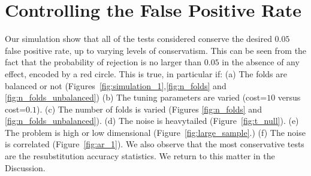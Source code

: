\documentclass[12pt,a4paper]{article}
\theoremstyle{definition}
\begin{document}
\section{Controlling the False Positive Rate}
\label{sec:type_i}

Our simulation show that all of the tests considered conserve the desired $0.05$ false positive rate, up to varying levels of conservatism.
This can be seen from the fact that the probability of rejection is no larger than $0.05$ in the absence of any effect, encoded by a red circle. 
This is true, in particular if: \newline
(a) The folds are balanced or not (Figures~\ref{fig:simulation_1},\ref{fig:n_folds} and \ref{fig:n_folds_unbalanced}) \newline
(b) The tuning parameters are varied (cost=$10$ versus cost=$0.1$). \newline
(c) The number of folds is varied (Figures \ref{fig:n_folds} and \ref{fig:n_folds_unbalanced}). \newline
(d) The noise is heavytailed (Figure~\ref{fig:t_null}). \newline
(e) The problem is high or low dimensional (Figure~\ref{fig:large_sample}.) \newline
(f) The noise is correlated (Figure~\ref{fig:ar_1}). \newline
We also observe that the most conservative tests are the resubstitution accuracy statistics. 
We return to this matter in the Discussion.
\end{document}
